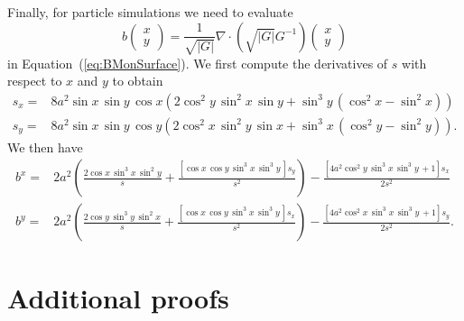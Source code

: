 \documentclass[11pt, a4paper]{article}
\newcommand{\cdummy}{\cdot}
\begin{document}
Finally, for particle simulations we need to evaluate
\[
b\begin{pmatrix}
      x \\ y 
   \end{pmatrix} = \frac{1}{\sqrt{| G |}} \nabla \cdummy \left(
   \sqrt{| G |} G^{- 1} \right) \begin{pmatrix}
      x \\ y 
   \end{pmatrix}
\]
in Equation~(\ref{eq:BMonSurface}).
We first compute the derivatives of $s$ with respect to $x$ and $y$ to obtain
\begin{eqnarray*}
    s_x =& 8 a^2 \sin x \,\sin y \,\cos x \left( 2 \cos^2y\, \sin^2x \,\sin y +
    \sin^3 y\, (\cos^2 x -\sin^2x) \right) \\
    s_y =& 8 a^2 \sin x \,\sin y \,\cos y \left( 2 \cos^2x \,\sin^2y\,\sin x +
    \sin^3 x\, (\cos^2 y -\sin^2y) \right).
\end{eqnarray*}
We then have
\begin{eqnarray*}
    b^x =& 2 a^2 \left( \frac{2 \cos x \,\sin^3 x\, \sin^2y}{s} +
    \frac{[\cos x \, \cos y \, \sin^3 x \, \sin^3y \,] s_y}{s^2}  \right)
    -\frac{[4a^2 \cos^2y \,\sin^3x\,\sin^3y\,+ 1] s_x}{2 s^2}\\
    b^y =&  2 a^2 \left( \frac{2 \cos y \,\sin^3 y\, \sin^2x}{s} +
    \frac{[\cos x \, \cos y \, \sin^3 x \, \sin^3y \,] s_x}{s^2}  \right)
    -\frac{[4a^2 \cos^2x \,\sin^3x\,\sin^3y\,+ 1] s_y}{2 s^2} .
\end{eqnarray*}

\section{Additional proofs}\label{app:aux-lemma}
\end{document}
